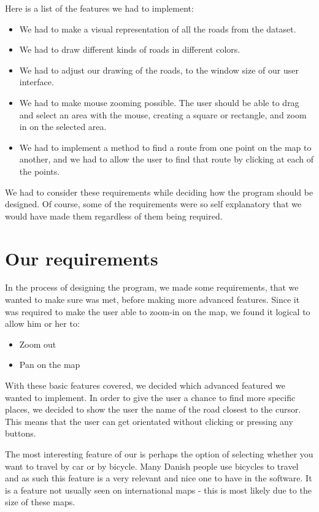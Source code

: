 Here is a list of the features we had to implement: 
\begin{itemize}
  \item We had to make a visual representation of all the roads from the
  dataset.
  \item We had to draw different kinds of roads in different colors.
  \item We had to adjust our drawing of the roads, to the window size of our
  user interface.
  \item We had to make mouse zooming possible.  The user should be able to drag
  and select an area with the mouse, creating a square or rectangle, and zoom in on the
  selected area.
  \item We had to implement a method to find a route from one point on the map to
  another, and we had to allow the user to find that route by clicking at each
  of the points.
\end{itemize}
We had to consider these requirements while
deciding how the program should be designed. Of course, some of the
requirements were so self explanatory that we would have made them regardless
of them being required.

\section{Our requirements}
In the process of designing the program, we made some requirements, that we
wanted to make sure was met, before making more advanced features. Since it was
required to make the user able to zoom-in on the map, we found it logical to
allow him or her to:
\begin{itemize}
  \item Zoom out
  \item Pan on the map
\end{itemize}

With these basic features covered, we decided which advanced featured we wanted
to implement. In order to give the user a chance to find more specific places, we
decided to show the user the name of the road closest to the cursor. This means
that the user can get orientated without clicking or pressing any buttons. 

The most interesting feature of our  is perhaps the
option of selecting whether you want to travel by car or by bicycle. Many Danish
people use bicycles to travel and as such this feature is a very relevant and
nice one to have in the software. It is a feature not usually seen on
international maps - this is most likely due to the size of these maps.

